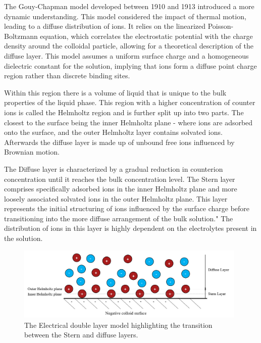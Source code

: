 The Gouy-Chapman model developed between 1910 and 1913 introduced a more dynamic understanding. This model considered the impact of thermal motion, leading to a diffuse distribution of ions. It relies on the linearized Poisson-Boltzmann equation, which correlates the electrostatic potential with the charge density around the colloidal particle, allowing for a theoretical description of the diffuse layer. This model assumes a uniform surface charge and a homogeneous dielectric constant for the solution, implying that ions form a diffuse point charge region rather than discrete binding sites.


Within this region there is a volume of liquid that is unique to the bulk properties of the liquid phase. This region with a higher concentration of counter ions is called the Helmholtz region and is further split up into two parts. The closest to the surface being the inner Helmholtz plane - where ions are adsorbed onto the surface, and the outer Helmholtz layer contains solvated ions. Afterwards the diffuse layer is made up of unbound free ions influenced by Brownian motion.

The Diffuse layer is characterized by a gradual reduction in counterion concentration until it reaches the bulk concentration level. The Stern layer comprises specifically adsorbed ions in the inner Helmholtz plane and more loosely associated solvated ions in the outer Helmholtz plane. This layer represents the initial structuring of ions influenced by the surface charge before transitioning into the more diffuse arrangement of the bulk solution." The distribution of ions in this layer is highly dependent on the electrolytes present in the solution.

\begin{figure}[h]     %
        \begin{center}
          \includegraphics[width=110mm]{chapter1/SternLayer.PNG}
\end{center}
\caption{The Electrical double layer model highlighting the transition between the Stern and diffuse layers.}
\label{fig:Stern}                 %
\end{figure}

